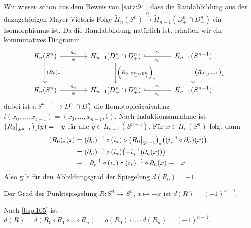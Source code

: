 \begin{beweis}
\begin{description}
\begin{align*}
		\end{align*}
		Wir wissen schon aus dem Beweis von \autoref{satz:94}, dass die Randabbildung aus der dazugehörigen Mayer-Vietoris-Folge $\tilde{H}_n(S^n) \xrightarrow{\partial_n} \tilde{H}_{n-1}(D^n_+ \cap D_-^n)$ ein Isomorphismus ist. 
		Da die Randabbildung natürlich ist, erhalten wir ein kommutatives Diagramm
		\[
			\begin{tikzcd}[row sep=3em, column sep=4em]
				\tilde{H}_n(S^n) \rar["\partial_n","\cong"'] \dar["(R_0)_*"]
				& \tilde{H}_{n-1}(D^n_- \cap D^n_+) \dar["\enbrace*{R_0|_{D^n_- \cap D^n_+}}_*"]  
				& \tilde{H}_{n-1}(S^{n-1}) \lar["i_*","\cong"'] \dar["\enbrace*{R_0|_{S^{n-1}}}_*"]\\
				\tilde{H}_n(S^n) \rar["\partial_n","\cong"']
				& \tilde{H}_{n-1}(D^n_- \cap D^n_+) 
				& \tilde{H}_{n-1}(S^{n-1}) \lar["i_*","\cong"']
			\end{tikzcd}
		\]
		dabei ist $i\colon S^{n-1} \to D^n_- \cap D_+^n$ die Homotopieäquivalenz $i(x_0, \ldots , x_{n-1}) = (x_0, \ldots , x_{n-1},0)$.
		Nach Induktionsannahme ist $\enbrace*{R_0\big|_{S^{n-1}}}_*(y)= -y$ für alle $y \in \tilde{H}_{n-1}(S^{n-1})$. 
		Für $x \in \tilde{H}_n(S^n)$ folgt dann
		\begin{align*}
			(R_0)_*(x) &= (\partial_n) ^{-1} \circ  (i_*) \circ \enbrace*{R_0\big|_{S^{n-1}}}_* \enbrace[\big]{(i_* ^{-1} \circ \partial_n) (x)} \\
			&= (\partial_n) ^{-1} \circ (i_*) \enbrace*{- i_*^{-1} \enbrace*{\partial_n (x)} } \\
			&= - \partial_n ^{-1} \circ (i_*) \circ (i_*)^{-1} \circ \partial_n(x)= -x 
		\end{align*}
		Also gilt für den Abbildungsgrad der Spiegelung $d(R_0)=-1$. \qedhere
	\end{description}
\end{beweis}

\begin{beispiel}[{name=[Grad der Punktspiegelung]},label=bsp:106]
	Der Grad der Punktspiegelung $R \colon S^n \to S^n$, $x  \mapsto -x$ ist $d(R)=(-1)^{n+1}$.
\end{beispiel}
\begin{beweis}
	Nach \autoref{bsp:105} ist $d(R)= d(R_0 \circ R_1 \circ \ldots \circ R_n) = d(R_0) \cdot \ldots \cdot d(R_n)= (-1)^{n+1}$.
\end{beweis}

